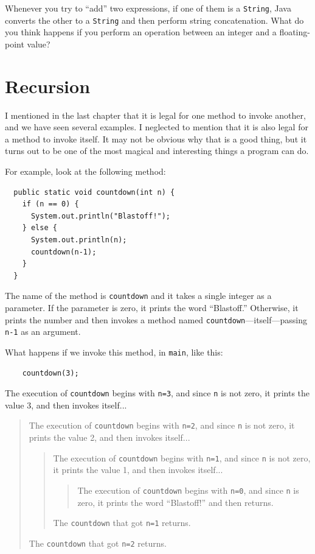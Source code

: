 \documentclass[12pt]{book}
\theoremstyle{exercise}
\begin{document}
Whenever you try to ``add'' two
expressions, if one of them is a {\tt String}, Java converts the
other to a {\tt String} and then perform string concatenation.  What do you
think happens if you perform an operation between an integer and a
floating-point value?


\section{Recursion}
\label{recursion}

I mentioned in the last chapter that it is legal for one method to
invoke another, and we have seen several examples.  I neglected to
mention that it is also legal for a method to invoke itself.  It may
not be obvious why that is a good thing, but it turns out to be one of
the most magical and interesting things a program can do.

For example, look at the following method:

\begin{lstlisting}
  public static void countdown(int n) {
    if (n == 0) {
      System.out.println("Blastoff!");
    } else {
      System.out.println(n);
      countdown(n-1);
    }
  }
\end{lstlisting}
%
The name of the method is {\tt countdown} and it takes a single
integer as a parameter.  If the parameter is zero, it prints
the word ``Blastoff.''  Otherwise, it prints the number and
then invokes a method named {\tt countdown}---itself---passing
{\tt n-1} as an argument.

What happens if we invoke this method, in {\tt main}, like
this:

\begin{lstlisting}
    countdown(3);
\end{lstlisting}
%
The execution of {\tt countdown} begins with {\tt n=3}, and
since {\tt n} is not zero, it prints the value 3, and then
invokes itself...

\begin{quote}
The execution of {\tt countdown} begins with {\tt n=2}, and
since {\tt n} is not zero, it prints the value 2, and then
invokes itself...

\begin{quote}
The execution of {\tt countdown} begins with {\tt n=1}, and
since {\tt n} is not zero, it prints the value 1, and then
invokes itself...

\begin{quote}
The execution of {\tt countdown} begins with {\tt n=0}, and
since {\tt n} is zero, it prints the word ``Blastoff!''
and then returns.
\end{quote}

The {\tt countdown} that got {\tt n=1} returns.

\end{quote}

The {\tt countdown} that got {\tt n=2} returns.

\end{quote}
\end{document}
